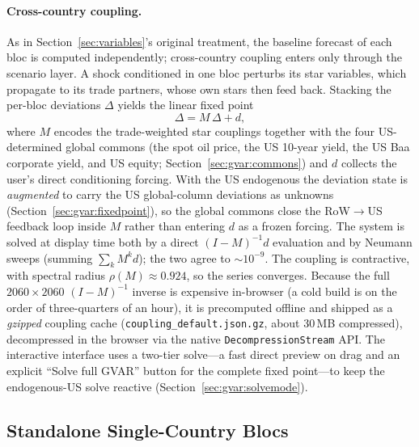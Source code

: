 \documentclass[11pt]{article}
\theoremstyle{definition}
\theoremstyle{remark}
\begin{document}
\paragraph{Cross-country coupling.} As in Section~\ref{sec:variables}'s
original treatment, the baseline forecast of each bloc is computed
independently; cross-country coupling enters only through the scenario
layer. A shock conditioned in one bloc perturbs its star variables,
which propagate to its trade partners, whose own stars then feed back.
Stacking the per-bloc deviations $\Delta$ yields the linear fixed point
\begin{equation}\label{eq:gvar-fixedpoint}
  \Delta = M\,\Delta + d,
\end{equation}
where $M$ encodes the trade-weighted star couplings together with the four
US-determined global commons (the spot oil price, the US 10-year yield, the US
Baa corporate yield, and US equity; Section~\ref{sec:gvar:commons}) and $d$
collects the user's direct conditioning forcing. With the US endogenous the
deviation state is \emph{augmented} to carry the US global-column deviations as
unknowns (Section~\ref{sec:gvar:fixedpoint}), so the global commons close the
RoW$\to$US feedback loop inside $M$ rather than entering $d$ as a frozen forcing.
The system is solved at display time both by a direct $(I-M)^{-1}d$ evaluation
and by Neumann sweeps (summing $\sum_k M^k d$); the two agree to $\sim 10^{-9}$.
The coupling is contractive, with spectral radius $\rho(M)\approx 0.924$, so
the series converges. Because the full $2060\times2060$ $(I-M)^{-1}$
inverse is expensive in-browser (a cold build is on the order of three-quarters
of an hour), it is precomputed offline and shipped as a \emph{gzipped} coupling
cache (\texttt{coupling\_default.json.gz}, about $30$\,MB compressed),
decompressed in the browser via the native \texttt{DecompressionStream} API.
The interactive interface uses a two-tier solve---a fast direct preview on drag
and an explicit ``Solve full GVAR'' button for the complete fixed point---to keep
the endogenous-US solve reactive (Section~\ref{sec:gvar:solvemode}).

\subsection{Standalone Single-Country Blocs}\label{sec:standalone}
\end{document}
